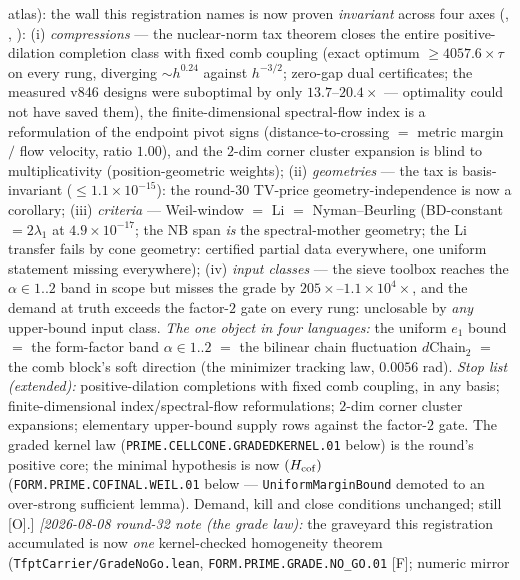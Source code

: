 \documentclass[11pt,a4paper]{article}
\begin{document}
{{atlas):} the wall this registration names is now proven
\emph{invariant} across four axes
(,
,
): (i) \emph{compressions} ---
the nuclear-norm tax theorem closes the entire positive-dilation
completion class with fixed comb coupling (exact optimum
$\ge 4057.6\times\tau$ on every rung, diverging $\sim h^{0.24}$
against $h^{-3/2}$; zero-gap dual certificates; the measured
v846 designs were suboptimal by only $13.7$--$20.4\times$ ---
optimality could not have saved them), the finite-dimensional
spectral-flow index is a reformulation of the endpoint pivot
signs (distance-to-crossing $=$ metric margin $/$ flow velocity,
ratio $1.00$), and the $2$-dim corner cluster expansion is blind
to multiplicativity (position-geometric weights); (ii)
\emph{geometries} --- the tax is basis-invariant
($\le 1.1\times10^{-15}$): the round-30 TV-price
geometry-independence is now a corollary; (iii) \emph{criteria}
--- Weil-window $=$ Li $=$ Nyman--Beurling (BD-constant $=
2\lambda_1$ at $4.9\times10^{-17}$; the NB span \emph{is} the
spectral-mother geometry; the Li transfer fails by cone
geometry: certified partial data everywhere, one uniform
statement missing everywhere); (iv) \emph{input classes} --- the
sieve toolbox reaches the $\alpha \in 1..2$ band in scope but
misses the grade by $205\times$--$1.1\times10^{4}\times$, and
the demand at truth exceeds the factor-$2$ gate on every rung:
unclosable by \emph{any} upper-bound input class.  \emph{The one
object in four languages:} the uniform $e_1$ bound $=$ the
form-factor band $\alpha \in 1..2$ $=$ the bilinear chain
fluctuation $d\mathrm{Chain}_2$ $=$ the comb block's soft
direction (the minimizer tracking law, $0.0056$ rad).
\emph{Stop list (extended):} positive-dilation completions with
fixed comb coupling, in any basis; finite-dimensional
index/spectral-flow reformulations; $2$-dim corner cluster
expansions; elementary upper-bound supply rows against the
factor-$2$ gate.  The graded kernel law
(\texttt{PRIME.CELLCONE.GRADEDKERNEL.01} below) is the round's
positive core; the minimal hypothesis is now $(H_{\rm cof})$
(\texttt{FORM.PRIME.COFINAL.WEIL.01} below ---
\texttt{UniformMarginBound} demoted to an over-strong sufficient
lemma).  Demand, kill and close conditions unchanged; still
[O].]
\emph{[2026-08-08 round-32 note (the grade law):} the graveyard
this registration accumulated is now \emph{one} kernel-checked
homogeneity theorem
(\texttt{TfptCarrier/GradeNoGo.lean},
\texttt{FORM.PRIME.GRADE.NO\_GO.01} [F]; numeric mirror
}
\end{document}
